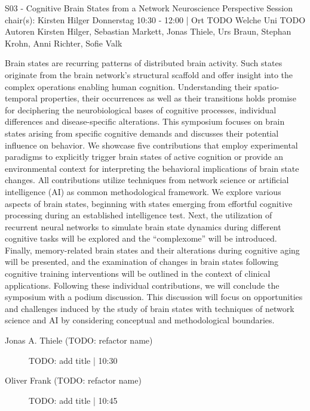 
            \begin{symposium}
            {S03 - Cognitive Brain States from a Network Neuroscience Perspective }
            {Session chair(s): Kirsten Hilger}
            {Donnerstag 10:30 - 12:00 | Ort TODO}
            {Welche Uni TODO}
            Autoren Kirsten Hilger, Sebastian Markett, Jonas Thiele, Urs Braun, Stephan Krohn, Anni Richter, Sofie Valk

Brain states are recurring patterns of distributed brain activity. Such states originate from the brain network's structural scaffold and offer insight into the complex operations enabling human cognition. Understanding their spatio-temporal properties, their occurrences as well as their transitions holds promise for deciphering the neurobiological bases of cognitive processes, individual differences and disease-specific alterations.
This symposium focuses on brain states arising from specific cognitive demands and discusses their potential influence on behavior. We showcase five contributions that employ experimental paradigms to explicitly trigger brain states of active cognition or provide an environmental context for interpreting the behavioral implications of brain state changes. All contributions utilize techniques from network science or artificial intelligence (AI) as common methodological framework.
We explore various aspects of brain states, beginning with states emerging from effortful cognitive processing during an established intelligence test. Next, the utilization of recurrent neural networks to simulate brain state dynamics during different cognitive tasks will be explored and the “complexome” will be introduced. Finally, memory-related brain states and their alterations during cognitive aging will be presented, and the examination of changes in brain states following cognitive training interventions will be outlined in the context of clinical applications.
Following these individual contributions, we will conclude the symposium with a podium discussion. This discussion will focus on opportunities and challenges induced by the study of brain states with techniques of network science and AI by considering conceptual and methodological boundaries.
            \begin{description}    
            
                \item [Jonas A. Thiele (TODO: refactor name)] TODO: add title \textcolor{mygray}{ | 10:30}    
                
                \item [Oliver Frank  (TODO: refactor name)] TODO: add title \textcolor{mygray}{ | 10:45}    
                

\end{description}
\end{symposium}
